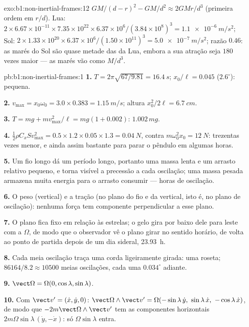 \begin{solution}{exo:b1:non-inertial-frames:12}
$GM/(d - r)^2 - GM/d^2 \approx 2GMr/d^3$ (primeira ordem em $r/d$). Lua:
$2 \times 6.67\times10^{-11} \times 7.35\times10^{22} \times 6.37\times10^6/
(3.84\times10^8)^3 = \qty{1.1e-6}{m/s^2}$; Sol: $2 \times 1.33\times10^{20}
\times 6.37\times10^6/(1.50\times10^{11})^3 = \qty{5.0e-7}{m/s^2}$; razão
$0.46$: as marés do Sol são quase metade das da Lua, embora a sua atração
seja $180$ vezes maior --- as marés vão como $M/d^3$.
\end{solution}

\begin{solution}{pb:b1:non-inertial-frames:1}
\textbf{1.} $T = 2\pi\sqrt{67/9.81} = \qty{16.4}{s}$; $x_0/\ell = 0.045$
($2.6^\circ$): pequena.

\textbf{2.} $v_{\max} = x_0\omega_0 = 3.0 \times 0.383 = \qty{1.15}{m/s}$; altura
$x_0^2/2\ell = \qty{6.7}{cm}$.

\textbf{3.} $T = mg + mv_{\max}^2/\ell = mg(1 + 0.002)$: $1.002\,mg$.

\textbf{4.} $\tfrac12\rho C_xSv_{\max}^2 = 0.5 \times 1.2 \times 0.05 \times 1.3 =
\qty{0.04}{N}$, contra $m\omega_0^2x_0 = \qty{12}{N}$: trezentas vezes
menor, e ainda assim bastante para parar o pêndulo em algumas horas.

\textbf{5.} Um fio longo dá um período longo, portanto uma massa lenta e um
arrasto relativo pequeno, e torna visível a precessão a cada oscilação; uma
massa pesada armazena muita energia para o arrasto consumir --- horas de
oscilação.

\textbf{6.} O peso (vertical) e a tração (no plano do fio e da vertical,
isto é, no plano de oscilação): nenhuma força tem componente perpendicular
a esse plano.

\textbf{7.} O plano fica fixo em relação às estrelas; o gelo gira por baixo
dele para leste com a  $\Omega$, de modo que o observador
vê o plano girar no sentido horário, de volta ao ponto de partida depois de
um dia sideral, \qty{23.93}{h}.

\textbf{8.} Cada meia oscilação traça uma corda ligeiramente girada: uma
roseta; $86164/8.2 \approx 10500$ meias oscilações, cada uma $0.034^\circ$ adiante.

\textbf{9.} $\vect\Omega = \Omega(0, \cos\lambda, \sin\lambda)$.

\textbf{10.} Com $\vect v' = (\dot x, \dot y, 0)$:
$\vect\Omega\wedge\vect v' = \Omega(-\sin\lambda\,\dot y,\ \sin\lambda\,\dot x,\ -\cos\lambda\,\dot x)$,
de modo que $-2m\vect\Omega\wedge\vect v'$ tem as componentes horizontais
$2m\Omega\sin\lambda\,(\dot y, -\dot x)$: só $\Omega\sin\lambda$ entra.


\end{solution}
